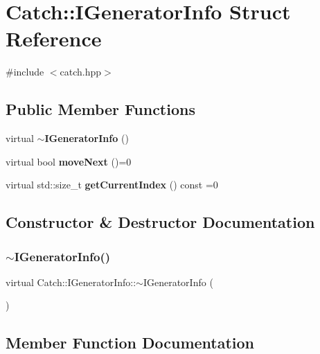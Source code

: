 \section{Catch\+:\+:I\+Generator\+Info Struct Reference}
\label{struct_catch_1_1_i_generator_info}


{\ttfamily \#include $<$catch.\+hpp$>$}

\subsection*{Public Member Functions}
\begin{DoxyCompactItemize}
\item 
virtual \textbf{ $\sim$\+I\+Generator\+Info} ()
\item 
virtual bool \textbf{ move\+Next} ()=0
\item 
virtual std\+::size\+\_\+t \textbf{ get\+Current\+Index} () const =0
\end{DoxyCompactItemize}


\subsection{Constructor \& Destructor Documentation}
\mbox{\label{struct_catch_1_1_i_generator_info_a9266aa62993298510c2a8b5948abb8e6}} 
\subsubsection{$\sim$\+I\+Generator\+Info()}
{\footnotesize\ttfamily virtual Catch\+::\+I\+Generator\+Info\+::$\sim$\+I\+Generator\+Info (\begin{DoxyParamCaption}{ }\end{DoxyParamCaption})\hspace{0.3cm}{\ttfamily [virtual]}}



\subsection{Member Function Documentation}
\mbox{\label{struct_catch_1_1_i_generator_info_a6a0dca712d31f6849fd9447b1344673a}} 
